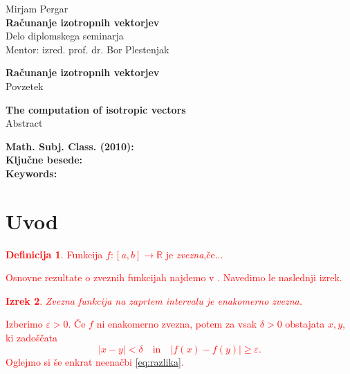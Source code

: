 \documentclass[12pt,a4paper]{amsart}
\theoremstyle{definition}
\newtheorem{definicija}{Definicija}[section]
\theoremstyle{plain}
\newtheorem{izrek}[definicija]{Izrek}
\newcommand{\R}{\mathbb R}
\begin{document}
\thispagestyle{empty}
\vfill

\begin{center}{\large
Mirjam Pergar\\[2mm]
{\bf Računanje izotropnih vektorjev}\\[10mm]
Delo diplomskega seminarja\\[1cm]
Mentor: izred. prof. dr. Bor Plestenjak}
\end{center}
\vfill

\pagebreak

\thispagestyle{empty}
\tableofcontents
\pagebreak

\thispagestyle{empty}
\begin{center}
{\bf Računanje izotropnih vektorjev}\\[3mm]
{\sc Povzetek}
\end{center}

\vfill
\begin{center}
{\bf The computation of isotropic vectors}\\[3mm]
{\sc Abstract}
\end{center}

\vfill\noindent
{\bf Math. Subj. Class. (2010):}   \\[1mm]
{\bf Ključne besede:}   \\[1mm]
{\bf Keywords:}
\pagebreak


\section{Uvod}

\textcolor{Red}{\begin{definicija}
Funkcija $f\colon [a,b]\to\R$ je {\em zvezna},če... 
\end{definicija}
%
Osnovne rezultate o zveznih funkcijah najdemo v \cite{glob}. Navedimo le naslednji izrek.
%
\begin{izrek}
Zvezna funkcija na zaprtem intervalu je enakomerno zvezna.
\end{izrek}
%
\proof
Izberimo $\varepsilon>0$. Če $f$ ni enakomerno zvezna, potem za vsak $\delta>0$ obstajata $x,y$, ki zadoščata
\begin{equation}\label{eq:razlika}
|x-y|<\delta\quad \text{in}\quad |f(x)-f(y)| \ge \varepsilon.
\end{equation}
\endproof
%
Oglejmo si še enkrat neenačbi \eqref{eq:razlika}.}
\end{document}
